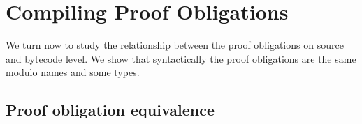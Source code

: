 

\newtheorem{pogEquiv}{Theorem}
\newtheorem{postProp}{Lemme} %


\section{Compiling Proof Obligations} \label{proofPogEq}

We turn now to study the relationship between the proof obligations on source and bytecode level. 
We show that syntactically the proof obligations are the same modulo names and some types.





\subsection{ Proof obligation equivalence}




%



